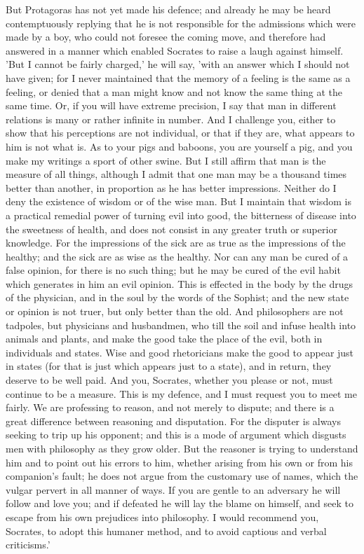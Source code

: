 But Protagoras has not yet made his defence; and already he may be heard
contemptuously replying that he is not responsible for the admissions
which were made by a boy, who could not foresee the coming move, and
therefore had answered in a manner which enabled Socrates to raise a
laugh against himself. 'But I cannot be fairly charged,' he will say,
'with an answer which I should not have given; for I never maintained
that the memory of a feeling is the same as a feeling, or denied that a
man might know and not know the same thing at the same time. Or, if you
will have extreme precision, I say that man in different relations is
many or rather infinite in number. And I challenge you, either to show
that his perceptions are not individual, or that if they are, what
appears to him is not what is. As to your pigs and baboons, you are
yourself a pig, and you make my writings a sport of other swine. But
I still affirm that man is the measure of all things, although I admit
that one man may be a thousand times better than another, in proportion
as he has better impressions. Neither do I deny the existence of wisdom
or of the wise man. But I maintain that wisdom is a practical remedial
power of turning evil into good, the bitterness of disease into the
sweetness of health, and does not consist in any greater truth or
superior knowledge. For the impressions of the sick are as true as the
impressions of the healthy; and the sick are as wise as the healthy. Nor
can any man be cured of a false opinion, for there is no such thing;
but he may be cured of the evil habit which generates in him an evil
opinion. This is effected in the body by the drugs of the physician, and
in the soul by the words of the Sophist; and the new state or opinion
is not truer, but only better than the old. And philosophers are not
tadpoles, but physicians and husbandmen, who till the soil and infuse
health into animals and plants, and make the good take the place of the
evil, both in individuals and states. Wise and good rhetoricians make
the good to appear just in states (for that is just which appears just
to a state), and in return, they deserve to be well paid. And you,
Socrates, whether you please or not, must continue to be a measure.
This is my defence, and I must request you to meet me fairly. We are
professing to reason, and not merely to dispute; and there is a great
difference between reasoning and disputation. For the disputer is always
seeking to trip up his opponent; and this is a mode of argument which
disgusts men with philosophy as they grow older. But the reasoner is
trying to understand him and to point out his errors to him, whether
arising from his own or from his companion's fault; he does not argue
from the customary use of names, which the vulgar pervert in all manner
of ways. If you are gentle to an adversary he will follow and love you;
and if defeated he will lay the blame on himself, and seek to escape
from his own prejudices into philosophy. I would recommend you,
Socrates, to adopt this humaner method, and to avoid captious and verbal
criticisms.'

